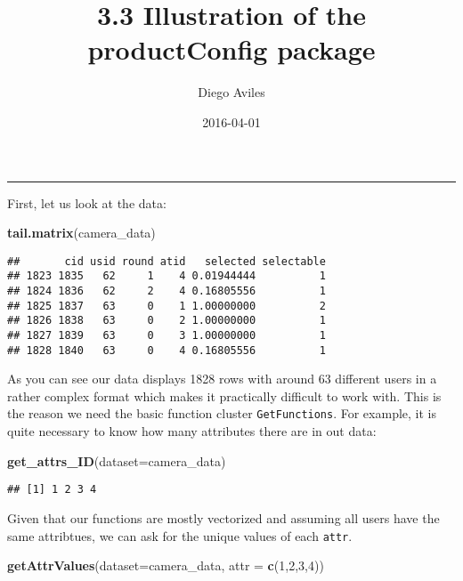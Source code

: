 \documentclass[]{article}
\title{3.3 Illustration of the productConfig package}
\author{Diego Aviles}
\date{2016-04-01}
\newenvironment{Shaded}{\begin{snugshade}}{\end{snugshade}}
\newcommand{\KeywordTok}[1]{\textcolor[rgb]{0.13,0.29,0.53}{\textbf{{#1}}}}
\newcommand{\DataTypeTok}[1]{\textcolor[rgb]{0.13,0.29,0.53}{{#1}}}
\newcommand{\DecValTok}[1]{\textcolor[rgb]{0.00,0.00,0.81}{{#1}}}
\newcommand{\NormalTok}[1]{{#1}}
\begin{document}
\maketitle


\begin{center}\rule{0.5\linewidth}{\linethickness}\end{center}

First, let us look at the data:

\begin{Shaded}
\begin{Highlighting}[]
\KeywordTok{tail.matrix}\NormalTok{(camera_data)}
\end{Highlighting}
\end{Shaded}

\begin{verbatim}
##       cid usid round atid   selected selectable
## 1823 1835   62     1    4 0.01944444          1
## 1824 1836   62     2    4 0.16805556          1
## 1825 1837   63     0    1 1.00000000          2
## 1826 1838   63     0    2 1.00000000          1
## 1827 1839   63     0    3 1.00000000          1
## 1828 1840   63     0    4 0.16805556          1
\end{verbatim}

As you can see our data displays 1828 rows with around 63 different
users in a rather complex format which makes it practically difficult to
work with. This is the reason we need the basic function cluster
\texttt{GetFunctions}. For example, it is quite necessary to know how
many attributes there are in out data:

\begin{Shaded}
\begin{Highlighting}[]
\KeywordTok{get_attrs_ID}\NormalTok{(}\DataTypeTok{dataset=}\NormalTok{camera_data)}
\end{Highlighting}
\end{Shaded}

\begin{verbatim}
## [1] 1 2 3 4
\end{verbatim}

Given that our functions are mostly vectorized and assuming all users
have the same attribtues, we can ask for the unique values of each
\texttt{attr}.

\begin{Shaded}
\begin{Highlighting}[]
\KeywordTok{getAttrValues}\NormalTok{(}\DataTypeTok{dataset=}\NormalTok{camera_data, }\DataTypeTok{attr =} \KeywordTok{c}\NormalTok{(}\DecValTok{1}\NormalTok{,}\DecValTok{2}\NormalTok{,}\DecValTok{3}\NormalTok{,}\DecValTok{4}\NormalTok{))}
\end{Highlighting}
\end{Shaded}
\end{document}
